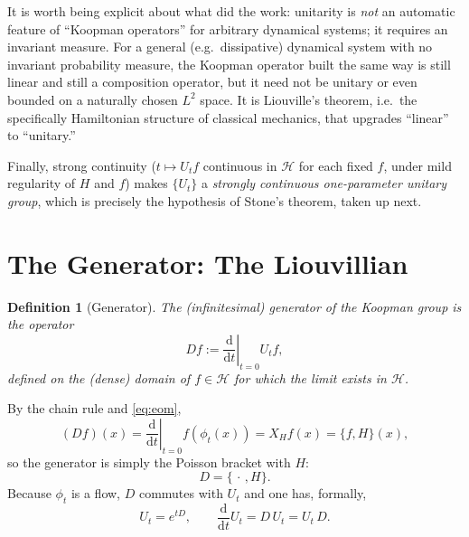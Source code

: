 \documentclass[11pt]{article}
\newtheorem{definition}[proposition]{Definition}
\theoremstyle{remark}
\newcommand{\PB}[2]{\{#1,#2\}}
\newcommand{\dd}{\mathrm{d}}
\begin{document}
It is worth being explicit about what did the work: unitarity is \emph{not} an automatic feature of ``Koopman operators'' for arbitrary dynamical systems; it requires an invariant measure. For a general (e.g.\ dissipative) dynamical system with no invariant probability measure, the Koopman operator built the same way is still linear and still a composition operator, but it need not be unitary or even bounded on a naturally chosen $L^2$ space. It is Liouville's theorem, i.e.\ the specifically Hamiltonian structure of classical mechanics, that upgrades ``linear'' to ``unitary.''

Finally, strong continuity ($t\mapsto U_tf$ continuous in $\mathcal H$ for each fixed $f$, under mild regularity of $H$ and $f$) makes $\{U_t\}$ a \emph{strongly continuous one-parameter unitary group}, which is precisely the hypothesis of Stone's theorem, taken up next.

\section{The Generator: The Liouvillian}
\label{sec:generator}

\begin{definition}[Generator]
The (infinitesimal) generator of the Koopman group is the operator
\begin{equation}
Df := \left.\frac{\dd}{\dd t}\right|_{t=0} U_tf,
\end{equation}
defined on the (dense) domain of $f\in\mathcal H$ for which the limit exists in $\mathcal H$.
\end{definition}

By the chain rule and \eqref{eq:eom},
\begin{equation}
(Df)(x) = \left.\frac{\dd}{\dd t}\right|_{t=0} f(\phi_t(x)) = X_H f(x) = \PB{f}{H}(x),
\end{equation}
so the generator is simply the Poisson bracket with $H$:
\begin{equation}
D = \PB{\,\cdot\,}{H}.
\label{eq:Ddef}
\end{equation}
Because $\phi_t$ is a flow, $D$ commutes with $U_t$ and one has, formally,
\begin{equation}
U_t = e^{tD}, \qquad \frac{\dd}{\dd t}U_t = D\,U_t = U_t\,D.
\label{eq:Uexp}
\end{equation}
\end{document}

